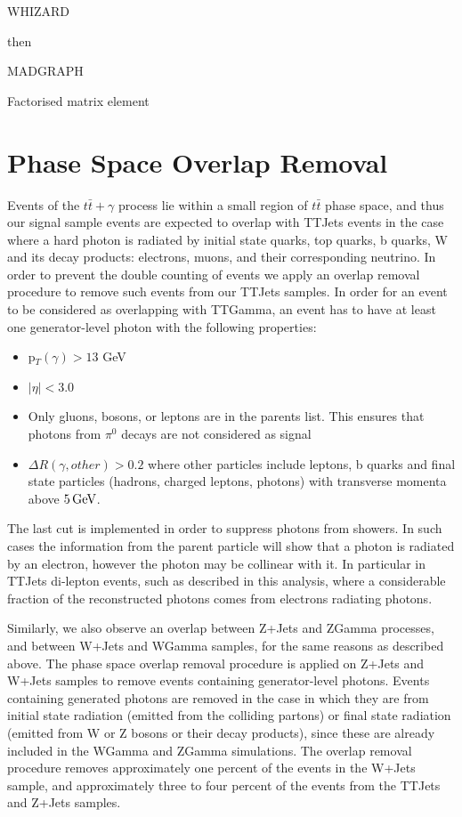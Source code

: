 WHIZARD

then

MADGRAPH

Factorised matrix element 

\section{Phase Space Overlap Removal} \label{sec-PhaseSpaceOverlapRemoval}

Events of the $t\bar{t}+\gamma$ process lie within a small region of $t\bar{t}$ phase space, and thus our signal sample events are expected to overlap with TTJets events in the case where a hard photon is radiated by initial state quarks, top quarks, b quarks, W and its decay products: electrons, muons, and their corresponding neutrino. In order to prevent the double counting of events we apply an overlap removal procedure to remove such events from our TTJets samples. In order for an event to be considered as overlapping with TTGamma, an event has to have at least one generator-level photon with the following properties:

\begin{itemize}
	\item p$_T(\gamma) > 13$ GeV
	\item $|\eta| < 3.0$
	\item Only gluons, bosons, or leptons are in the parents list. This ensures that photons from $\pi^0$ decays are not considered as signal
	\item $\Delta R(\gamma, other) > 0.2$ where other particles include leptons, b quarks and final state particles (hadrons, charged leptons, photons) with transverse momenta above $5 \,\text{Ge\hspace{-.08em}V}$.
\end{itemize}

The last cut is implemented in order to suppress photons from showers. In such cases the information from the parent particle will show that a photon is radiated by an electron, however the photon may be collinear with it. In particular in TTJets di-lepton events, such as described in this analysis, where a considerable fraction of the reconstructed photons comes from electrons radiating photons.

 Similarly, we also observe an overlap between Z+Jets and ZGamma processes, and between W+Jets and WGamma samples, for the same reasons as described above. The phase space overlap removal procedure is applied on Z+Jets and W+Jets samples to remove events containing generator-level photons. Events containing generated photons are removed in the case in which they are from initial state radiation (emitted from the colliding partons) or final state radiation (emitted from W or Z bosons or their decay products), since these are already included in the WGamma and ZGamma simulations. The overlap removal procedure removes approximately one percent of the events in the W+Jets sample, and approximately three to four percent of the events from the TTJets and Z+Jets samples.

